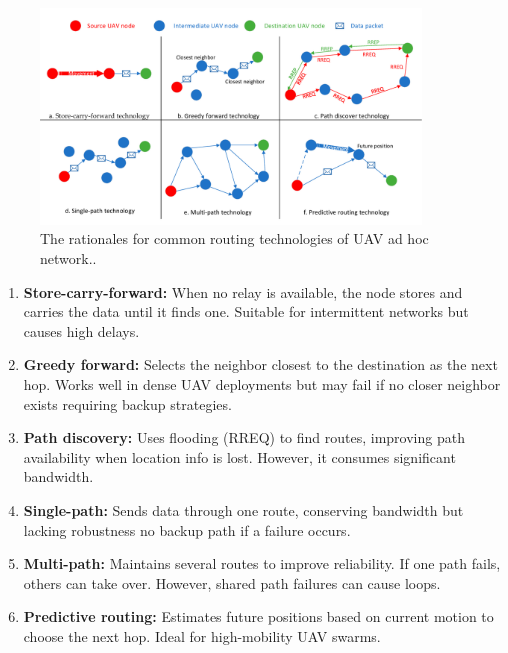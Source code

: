 \begin{figure}[ht]
\centering
\includegraphics[width=0.9\textwidth]{Figures/Chapter1/Section6/1.png}
\caption{The rationales for common routing technologies of UAV ad hoc network.\cite{Chen2020}.}
\label{fig:The rationales for common routing technologies of UAV ad hoc network.}
\end{figure}



\begin{enumerate}
    \item \textbf{Store-carry-forward:} When no relay is available, the node stores and carries the data until it finds one. Suitable for intermittent networks but causes high delays.

    \item \textbf{Greedy forward:} Selects the neighbor closest to the destination as the next hop. Works well in dense UAV deployments but may fail if no closer neighbor exists requiring backup strategies.

    \item \textbf{Path discovery:} Uses flooding (RREQ) to find routes, improving path availability when location info is lost. However, it consumes significant bandwidth.

    \item \textbf{Single-path:} Sends data through one route, conserving bandwidth but lacking robustness no backup path if a failure occurs.

    \item \textbf{Multi-path:} Maintains several routes to improve reliability. If one path fails, others can take over. However, shared path failures can cause loops.

    \item \textbf{Predictive routing:} Estimates future positions based on current motion to choose the next hop. Ideal for high-mobility UAV swarms.
\end{enumerate}



